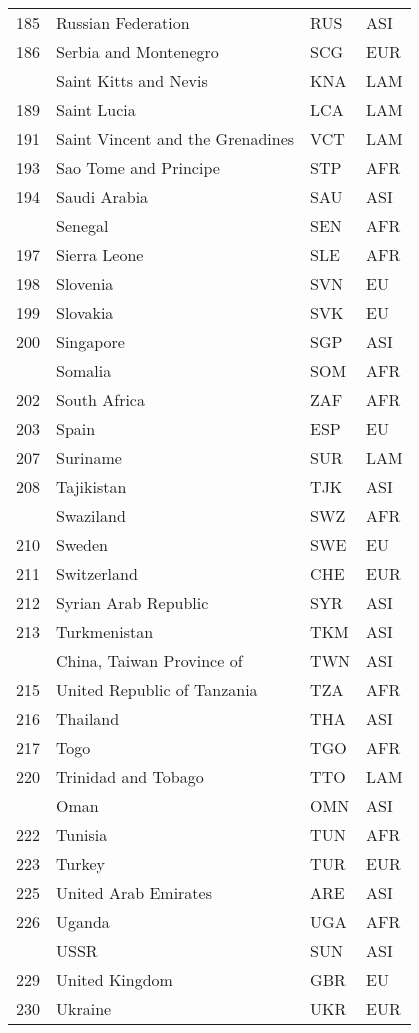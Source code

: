 \documentclass[]{article}
\begin{document}
\begin{longtable}[t]{rlll}
185 & Russian Federation & RUS & ASI\\
186 & Serbia and Montenegro & SCG & EUR\\
\addlinespace
188 & Saint Kitts and Nevis & KNA & LAM\\
189 & Saint Lucia & LCA & LAM\\
191 & Saint Vincent and the Grenadines & VCT & LAM\\
193 & Sao Tome and Principe & STP & AFR\\
194 & Saudi Arabia & SAU & ASI\\
\addlinespace
195 & Senegal & SEN & AFR\\
197 & Sierra Leone & SLE & AFR\\
198 & Slovenia & SVN & EU\\
199 & Slovakia & SVK & EU\\
200 & Singapore & SGP & ASI\\
\addlinespace
201 & Somalia & SOM & AFR\\
202 & South Africa & ZAF & AFR\\
203 & Spain & ESP & EU\\
207 & Suriname & SUR & LAM\\
208 & Tajikistan & TJK & ASI\\
\addlinespace
209 & Swaziland & SWZ & AFR\\
210 & Sweden & SWE & EU\\
211 & Switzerland & CHE & EUR\\
212 & Syrian Arab Republic & SYR & ASI\\
213 & Turkmenistan & TKM & ASI\\
\addlinespace
214 & China, Taiwan Province of & TWN & ASI\\
215 & United Republic of Tanzania & TZA & AFR\\
216 & Thailand & THA & ASI\\
217 & Togo & TGO & AFR\\
220 & Trinidad and Tobago & TTO & LAM\\
\addlinespace
221 & Oman & OMN & ASI\\
222 & Tunisia & TUN & AFR\\
223 & Turkey & TUR & EUR\\
225 & United Arab Emirates & ARE & ASI\\
226 & Uganda & UGA & AFR\\
\addlinespace
228 & USSR & SUN & ASI\\
229 & United Kingdom & GBR & EU\\
230 & Ukraine & UKR & EUR\\

\end{longtable}
\end{document}
